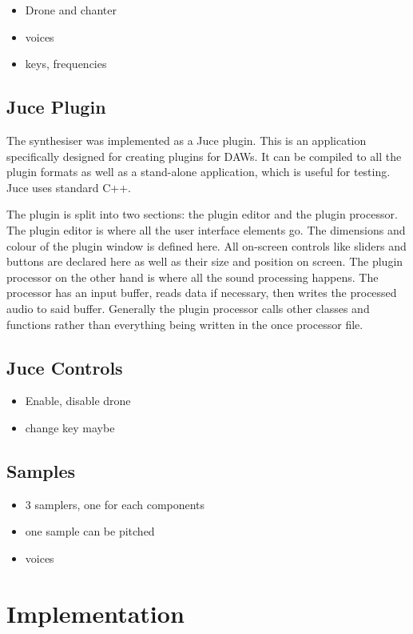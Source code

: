 \documentclass[12pt]{article}
\begin{document}
	\begin{itemize}
		\item Drone and chanter
		\item voices
		\item keys, frequencies
	\end{itemize}
	
	
	\subsection{Juce Plugin}
	The synthesiser was implemented as a Juce plugin. This is an application specifically designed for creating plugins for DAWs. 
	It can be compiled to all the plugin formats as well as a stand-alone application, which is useful for testing. Juce uses standard C++.
	
	The plugin is split into two sections: the plugin editor and the plugin processor. The plugin editor is where all the user interface elements go. 
	The dimensions and colour of the plugin window is defined here. All on-screen controls like sliders and buttons are declared here as well as their size and position on screen.
	The plugin processor on the other hand is where all the sound processing happens. The processor has an input buffer, reads data if necessary, then writes the processed
	audio to said buffer. Generally the plugin processor calls other classes and functions rather than everything being written in the once processor file.
		
	\subsection{Juce Controls}
	\begin{itemize}
		\item Enable, disable drone
		\item change key maybe
	\end{itemize}
	
	\subsection{Samples}
	\begin{itemize}
		\item 3 samplers, one for each components
		\item one sample can be pitched
		\item voices
	\end{itemize}
	
		
\section{Implementation}
	
\end{document}
